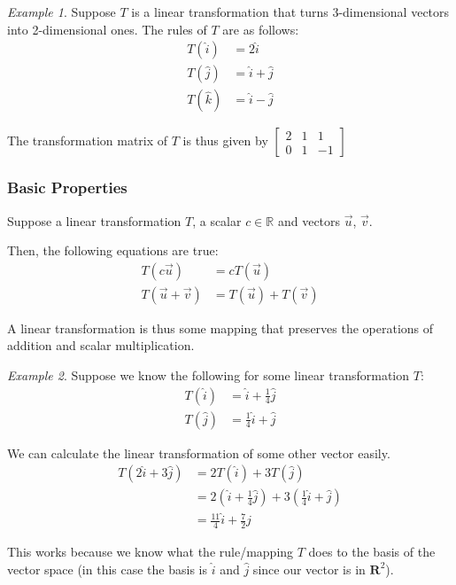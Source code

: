 \documentclass[a4paper]{article}
\theoremstyle{remark}
\newtheorem{example}{Example}
\theoremstyle{theorem}
\begin{document}
\begin{example}
	Suppose $T$ is a linear transformation that turns 3-dimensional vectors into 2-dimensional ones.
	The rules of $T$ are as follows:
	\begin{align}
		T(\hat{i})	& = 2\hat{i} \\
		T(\hat{j})	& = \hat{i} + \hat{j}\\
		T(\hat{k})	& = \hat{i} - \hat{j}
	\end{align}
	
	The transformation matrix of $T$ is thus given by
	$\begin{bmatrix}
		2 & 1 & 1 \\
		0 & 1 & -1
	\end{bmatrix}$

\end{example}

\subsubsection{Basic Properties}
Suppose a linear transformation $T$, a scalar $c\in\mathbb{R}$ and vectors $\vec{u}$, $\vec{v}$.

Then, the following equations are true:
\begin{align}
	T(c\vec{u}) 		& = cT(\vec{u}) \\
	T(\vec{u}+\vec{v}) 	& = T(\vec{u}) + T(\vec{v})
\end{align}

A linear transformation is thus some mapping that preserves the operations of addition and scalar multiplication.

\begin{example}
	Suppose we know the following for some linear transformation $T$:
	\begin{align}
		T(\hat{i}) & = \hat{i} + \frac{1}{4}\hat{j}\\
		T(\hat{j}) & = \frac{1}{4}\hat{i} + \hat{j}
	\end{align}

	We can calculate the linear transformation of some other vector easily.
	\begin{align}
		T(2\hat{i} + 3\hat{j}) 	& = 2T(\hat{i}) + 3T(\hat{j}) \\
								& = 2(\hat{i} + \frac{1}{4}\hat{j}) + 3(\frac{1}{4}\hat{i} + \hat{j}) \\
								& = \frac{11}{4}\hat{i} + \frac{7}{2}\hat{j}
	\end{align}

	This works because we know what the rule/mapping $T$ does to the basis of the vector space (in this case the basis is $\hat{i}$ and $\hat{j}$ since our vector is in $\mathbf{R}^2$).
\end{example}
\end{document}
